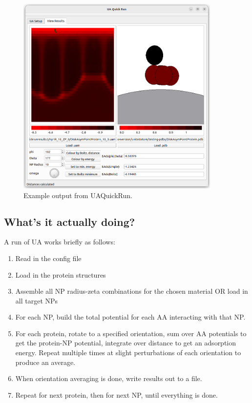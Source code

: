 \documentclass[10pt,a4paper,onecolumn]{report}
\begin{document}
\begin{figure} \label{fig:uaquickrun_results}
    \centering
    \includegraphics[width=0.9\textwidth]{figures/uaquickrun_screen.png}
    \caption{Example output from UAQuickRun.   }
\end{figure}


\subsection{What's it actually doing?}
A run of UA works briefly as follows:

\begin{enumerate}
\item Read in the config file
\item Load in the protein structures
\item Assemble all NP radius-zeta combinations for the chosen material OR load in all target NPs
\item For each NP, build the total potential for each AA interacting with that NP.
\item For each protein, rotate to a specified orientation, sum over AA potentials to get the protein-NP potential, integrate over distance to get an adsorption energy. Repeat multiple times at slight perturbations of each orientation to produce an average.
\item When orientation averaging is done, write results out to a file.
\item Repeat for next protein, then for next NP, until everything is done.

\end{enumerate}
\end{document}
